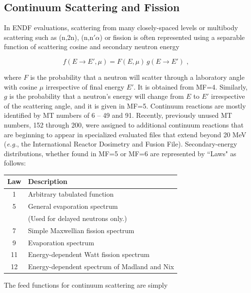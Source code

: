\subsection{Continuum Scattering and Fission}
\label{ssGROUPR_Continuum}

In ENDF evaluations, scattering from many closely-spaced levels or
multibody scattering such as (n,2n), (n,n$'\alpha$) or fission is often
represented using a separable function of scattering cosine and
secondary neutron energy

  \begin{equation}
    f(E{\rightarrow}E',\mu)=F(E,\mu)\,g(E{\rightarrow}E')\,\,,
  \label{Eq83}
  \end{equation}

\noindent
where $F$ is the probability that a neutron will scatter through a
laboratory angle with cosine $\mu$ irrespective of final energy $E'$.  It is
obtained from MF=4.  Similarly, $g$ is the probability that a neutron's
energy will change from $E$ to $E'$ irrespective of the scattering angle,
and it is given in MF=5.  Continuum reactions are mostly identified by
MT numbers of 6 -- 49 and 91.  Recently, previously unused MT numbers,
152 through 200, were assigned to additional continuum reactions
that are beginning to appear in specialized evaluated files that extend
beyond 20 MeV ({\it e.g.}, the International Reactor Dosimetry and Fusion
File).  Secondary-energy distributions, whether found in MF=5 or MF=6
are represented by ``Laws" as follows:

\begin{center}
\begin{tabular}{cl}
Law & Description \\ \hline
1  & Arbitrary tabulated function \\
5  & General evaporation spectrum \\
   & (Used for delayed neutrons only.) \\
7  & Simple Maxwellian fission spectrum \\
9  & Evaporation spectrum \\
11 & Energy-dependent Watt fission spectrum \\
12 & Energy-dependent spectrum of Madland and Nix \\ \hline
\end{tabular}
\end{center}
\vspace{3 pt}

The feed functions for continuum scattering are simply

